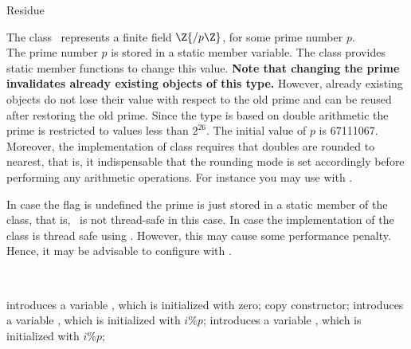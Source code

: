 \begin{ccRefClass} {Residue}
\label{Residue}

\def\ccTagOperatorLayout{\ccTrue}

\ccDefinition

The class \ccRefName\ represents a finite field $\Z{/p\Z}$, 
for some prime number $p$. \\

The prime number $p$ is stored in a static member variable. 
The class provides static member functions to change this value. 
{\bf Note that changing the prime invalidates already existing objects 
of this type.}
However, already existing objects do not lose their value with respect to the 
old prime and can be reused after restoring the old prime. 
Since the type is based on double 
arithmetic the prime is restricted to values less than $2^{26}$. 
The initial value of $p$ is 67111067. 
Moreover, the implementation of class  requires that 
doubles are rounded to nearest, that is, it indispensable that the 
rounding mode is set accordingly before performing any arithmetic operations. 
For instance you may use  with 
. 

In case the flag  
is undefined the prime is just stored in a static member 
of the class, that is, \ccRefName\ is not thread-safe in this case.  
In case 
the implementation of the class is thread safe using 
. However, this may cause some performance 
penalty. Hence, it may be advisable to configure  with 
. 


\ccIsModel
{}\\


\ccCreation
{}

{introduces a variable \ccVar, which is initialized with zero;}
\ccGlue
{}
{copy constructor;}
\ccGlue
{}
{introduces a variable \ccVar, which is initialized with $i \%  p$;}
\ccGlue
{}
{introduces a variable \ccVar, which is initialized with $i \%  p$;}

\ccOperations

\ccGlue
{}
\ccGlue
{}



\end{ccRefClass}
